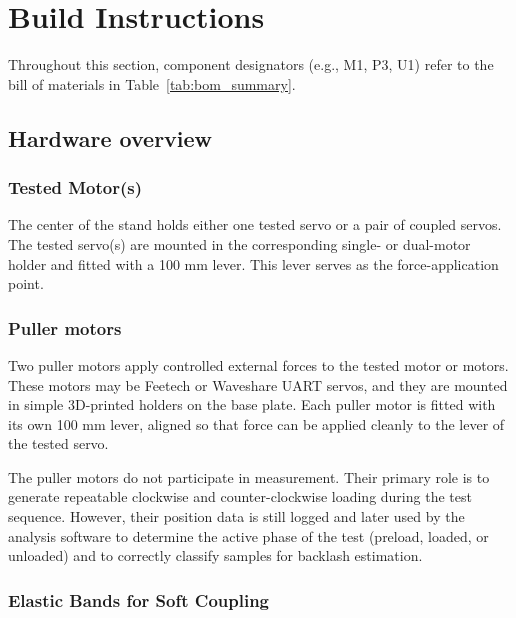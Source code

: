 \documentclass[11pt,letterpaper]{article}
\begin{document}
\newpage

\section{Build Instructions}
\label{sec:build-instructions}

Throughout this section, component designators (e.g., M1, P3, U1) refer to the bill of materials in Table~\ref{tab:bom_summary}.

\subsection{Hardware overview}
\label{subsec:hardware-overview}

\subsubsection{Tested Motor(s)}
\label{subsubsec:tested-motors}

The center of the stand holds either one tested servo or a pair of coupled servos. The tested servo(s) are mounted in the corresponding single- or dual-motor holder and fitted with a 100 mm lever. This lever serves  as the force-application point.

\subsubsection{Puller motors}
\label{subsubsec:puller-motors}

Two puller motors apply controlled external forces to the tested motor or motors. These motors may be Feetech or Waveshare UART servos, and they are mounted in simple 3D-printed holders on the base plate. Each puller motor is fitted with its own 100 mm lever, aligned so that force can be applied cleanly to the lever of the tested servo.

The puller motors do not participate in measurement. Their primary role is to generate repeatable clockwise and counter-clockwise loading during the test sequence. However, their position data is still logged and later used by the analysis software to determine the active phase of the test (preload, loaded, or unloaded) and to correctly classify samples for backlash estimation.

\subsubsection{Elastic Bands for Soft Coupling}
\label{subsubsec:elastic-bands}
\end{document}
